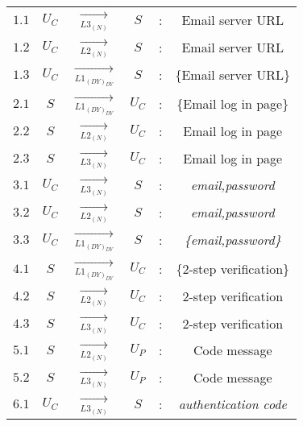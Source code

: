 \begin{center} 
\begin{tabular}{ p{.25cm} c c c c c } 

$1.1$ & $U_C$ & $\xrightarrow[L3_{(N)}]{}$ & $S$ & : & Email server URL \\ 

$1.2$ & $U_C$ & $\xrightarrow[L2_{(N)}]{}$ & $S$ & : & Email server URL \\ 

$1.3$ & $U_C$ & $\xrightarrow[L1_{(DY)_{DY}}]{}$ & $S$ & : & \{Email server URL\} \\ 


$2.1$ & $S$ & $\xrightarrow[L1_{(DY)_{DY}}]{}$ & $U_C$ & : & \{Email log in page\} \\ 

$2.2$ & $S$ & $\xrightarrow[L2_{(N)}]{}$ & $U_C$ & : & Email log in page \\ 

$2.3$ & $S$ & $\xrightarrow[L3_{(N)}]{}$ & $U_C$ & : & Email log in page \\ 


$3.1$ & $U_C$ & $\xrightarrow[L3_{(N)}]{}$ & $S$ & : & \textit{email,password} \\ 

$3.2$ & $U_C$ & $\xrightarrow[L2_{(N)}]{}$ & $S$ & : & \textit{email,password} \\ 

$3.3$ & $U_C$ & $\xrightarrow[L1_{(DY)_{DY}}]{}$ & $S$ & : & \textit{\{email,password\}} \\ 


$4.1$ & $S$ & $\xrightarrow[L1_{(DY)_{DY}}]{}$ & $U_C$ & : & \{2-step verification\} \\ 

$4.2$ & $S$ & $\xrightarrow[L2_{(N)}]{}$ & $U_C$ & : & 2-step verification \\ 

$4.3$ & $S$ & $\xrightarrow[L3_{(N)}]{}$ & $U_C$ & : & 2-step verification\\ 


$5.1$ & $S$ & $\xrightarrow[L2_{(N)}]{}$ & $U_P$ & : & Code message \\ 

$5.2$ & $S$ & $\xrightarrow[L3_{(N)}]{}$ & $U_P$ & : & Code message \\ 


$6.1$ & $U_C$ & $\xrightarrow[L3_{(N)}]{}$ & $S$ & : & \textit{authentication code} \\ 


\end{tabular}
\end{center}
